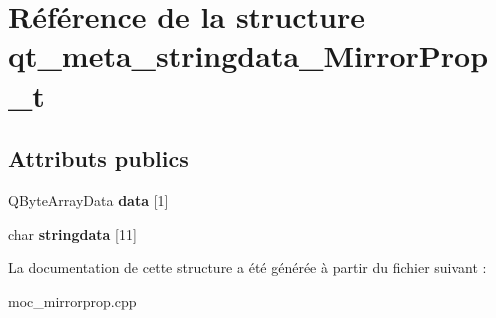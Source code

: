 \hypertarget{structqt__meta__stringdata__MirrorProp__t}{\section{Référence de la structure qt\+\_\+meta\+\_\+stringdata\+\_\+\+Mirror\+Prop\+\_\+t}
\label{structqt__meta__stringdata__MirrorProp__t}
}
\subsection*{Attributs publics}
\begin{DoxyCompactItemize}
\item 
\hypertarget{structqt__meta__stringdata__MirrorProp__t_a6b3c5ba600598e5f7f89414d7f0ef629}{Q\+Byte\+Array\+Data {\bfseries data} \mbox{[}1\mbox{]}}\label{structqt__meta__stringdata__MirrorProp__t_a6b3c5ba600598e5f7f89414d7f0ef629}

\item 
\hypertarget{structqt__meta__stringdata__MirrorProp__t_aca7ebec11bce4a92399b0fb339364a1e}{char {\bfseries stringdata} \mbox{[}11\mbox{]}}\label{structqt__meta__stringdata__MirrorProp__t_aca7ebec11bce4a92399b0fb339364a1e}

\end{DoxyCompactItemize}


La documentation de cette structure a été générée à partir du fichier suivant \+:\begin{DoxyCompactItemize}
\item 
moc\+\_\+mirrorprop.\+cpp\end{DoxyCompactItemize}

